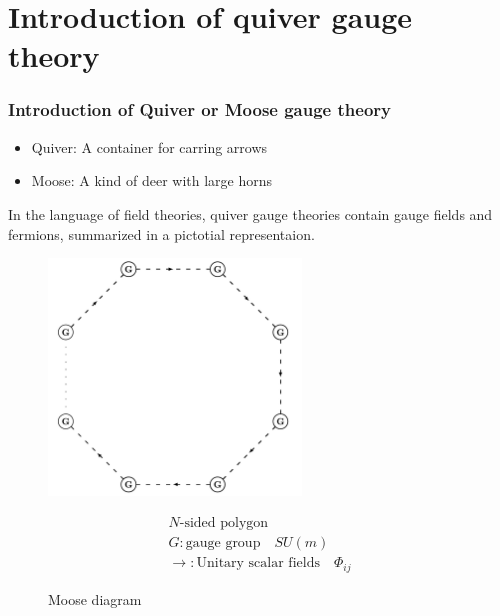 \documentclass{beamer}
\begin{document}
\section{Introduction of quiver gauge theory}
\begin{frame}
    \frametitle{Introduction of Quiver or Moose gauge theory}
    \begin{itemize}
        \item Quiver: A container for carring arrows
        \item Moose: A kind of deer with large horns 
    \end{itemize}
    

    In the language of field theories, quiver gauge theories contain gauge fields and fermions, summarized in a pictotial representaion.
    \begin{figure}
        \centering
        \begin{minipage}{0.45\textwidth}
            \centering
            \includegraphics[width=0.6\textwidth]{Moosed.jpeg}
            \caption*{Moose diagram}
        \end{minipage}
        \hspace{1em}
        \begin{minipage}{0.3\textwidth}
            \begin{gather*}
                N\text{-sided polygon}\\
                G: \text{gauge group} \quad SU(m)\\
                \rightarrow : \text{Unitary scalar fields}\quad \Phi_{ij} 
            \end{gather*}
        \end{minipage}
        
    \end{figure}
\end{frame}
\end{document}
